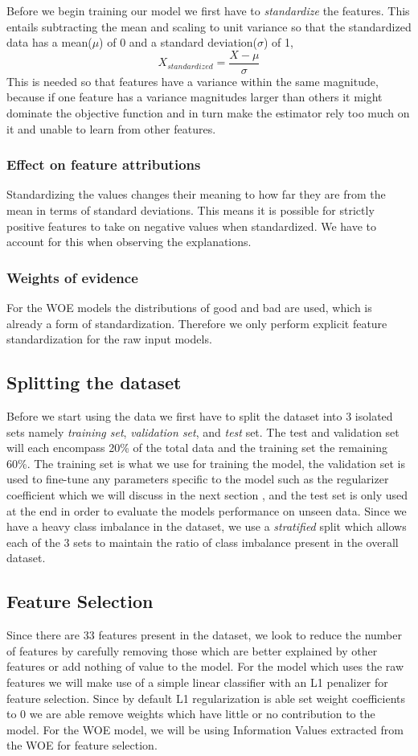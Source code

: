 Before we begin training our model we first have to \emph{standardize} the features. This entails subtracting the mean and scaling to unit variance so that the standardized data has a mean($\mu$) of 0 and a standard deviation($\sigma$) of 1,
\begin{equation}
    X_{standardized} = \frac{X-\mu}{\sigma}
\end{equation}
This is needed so that features have a variance within the same magnitude, because if one feature has a variance magnitudes larger than others it might dominate the objective function and in turn make the estimator rely too much on it and unable to learn from other features. 
\subsubsection{Effect on feature attributions} Standardizing the values changes their meaning to how far they are from the mean in terms of standard deviations. This means it is possible for strictly positive features to take on negative values when standardized. We have to account for this when observing the explanations.
\subsubsection{Weights of evidence}
For the WOE models the distributions of good and bad are used, which is already a form of standardization. Therefore we only perform explicit feature standardization for the raw input models.
\subsection{Splitting the dataset}
Before we start using the data we first have to split the dataset into 3 isolated sets namely \emph{training set}, \emph{validation set}, and \emph{test} set. The test and validation set will each encompass 20\% of the total data and the training set the remaining 60\%. The training set is what we use for training the model, the validation set is used to fine-tune any parameters specific to the model such as the regularizer coefficient which we will discuss in the  next section , and the test set is only used at the end in order to evaluate the models performance on unseen data. Since we have a heavy class imbalance in the dataset, we use a \emph{stratified} split which allows each of the 3 sets to maintain the ratio of class imbalance present in the overall dataset.
\subsection{Feature Selection}
Since there are 33 features present in the dataset, we look to reduce the number of features by carefully removing those which are better explained by other features or add nothing of value to the model.  For the model which uses the raw features we will make use of a simple linear classifier with an L1 penalizer for feature selection. Since by default L1 regularization is able set weight coefficients to 0 we are able remove weights which have little or no contribution to the model. For the WOE model, we will be using Information Values extracted from the WOE for feature selection.

